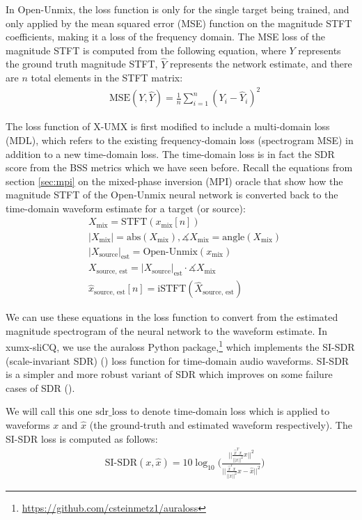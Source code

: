 \documentclass[report.tex]{subfiles}
\begin{document}
In Open-Unmix, the loss function is only for the single target being trained, and only applied by the mean squared error (MSE) function on the magnitude STFT coefficients, making it a loss of the frequency domain. The MSE loss of the magnitude STFT is computed from the following equation, where $Y$ represents the ground truth magnitude STFT, $\hat{Y}$ represents the network estimate, and there are $n$ total elements in the STFT matrix:
\begin{align}
	\nonumber & \text{MSE}(Y, \hat{Y}) = \frac{1}{n} \sum_{i = 1}^{n}{(Y_{i}-\hat{Y}_{i})^{2}}
\end{align}

The loss function of X-UMX is first modified to include a multi-domain loss (MDL), which refers to the existing frequency-domain loss (spectrogram MSE) in addition to a new time-domain loss. The time-domain loss is in fact the SDR score from the BSS metrics which we have seen before. Recall the equations from section \ref{sec:mpi} on the mixed-phase inversion (MPI) oracle that show how the magnitude STFT of the Open-Unmix neural network is converted back to the time-domain waveform estimate for a target (or source):
\begin{align}
	\nonumber & X_{\text{mix}} = \text{STFT}(x_{\text{mix}}[n])\\
	\nonumber & |X_{\text{mix}}| = \text{abs}(X_{\text{mix}}), \measuredangle{X_{\text{mix}}} = \text{angle}(X_{\text{mix}})\\
	\nonumber & {|X_{\text{source}}|}_{\text{est}} = \text{Open-Unmix}(x_{\text{mix}})\\
	\nonumber & X_{\text{source, est}} = {|X_{\text{source}}|}_{\text{est}} \cdot \measuredangle{X_{\text{mix}}}\\
	\nonumber & \hat{x}_{\text{source, est}}[n] = \text{iSTFT}(\hat{X}_{\text{source, est}})
\end{align}

We can use these equations in the loss function to convert from the estimated magnitude spectrogram of the neural network to the waveform estimate. In xumx-sliCQ, we use the auraloss Python package,\footnote{\url{https://github.com/csteinmetz1/auraloss}} which implements the SI-SDR (scale-invariant SDR) (\cite{roux2018sdr}) loss function for time-domain audio waveforms. SI-SDR is a simpler and more robust variant of SDR which improves on some failure cases of SDR (\cite{roux2018sdr}).

We will call this one $\text{sdr\_loss}$ to denote time-domain loss which is applied to waveforms $x$ and $\hat{x}$ (the ground-truth and estimated waveform respectively). The SI-SDR loss is computed as follows:
\begin{align}
	\nonumber & \text{SI-SDR}(x, \hat{x}) = 10 \log_{10}\Big(\frac{||\frac{\hat{x}^{T}x}{||x||^{2}} x||^{2}}{||\frac{\hat{x}^{T}x}{||x||^{2}} x - \hat{x}||^{2}}\Big)
\end{align}
\end{document}
